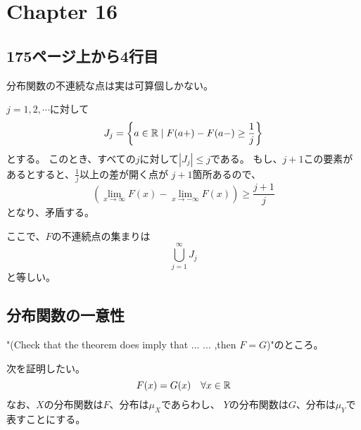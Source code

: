 \section{Chapter 16}
  \subsection{175ページ上から4行目}
    分布関数の不連続な点は実は可算個しかない。

    $j = 1,2,\cdots$に対して
    \[
      J_j = \left\{ a \in {\mathbb{R}} \mid F(a+) - F(a-) \ge \frac{1}{j} \right\}
    \]
    とする。
    このとき、すべての$j$に対して$|J_j| \leq j$である。
    もし、$j+1$この要素があるとすると、$\frac{1}{j}$以上の差が開く点が
    $j+1$箇所あるので、
    \[
      \left(\lim_{x \to \infty}F(x) - \lim_{x \to -\infty}F(x)\right) \ge \frac{j+1}{j}
    \]
    となり、矛盾する。

    ここで、$F$の不連続点の集まりは
    \[
      \bigcup_{j=1}^{\infty}J_j
    \]
    と等しい。

  \subsection{分布関数の一意性}
    "(Check that the theorem does imply that ... ... ,then $F = G$)"のところ。

    次を証明したい。
    \[
      F(x) = G(x) \quad \forall x \in {\mathbb{R}}
    \]
    なお、$X$の分布関数は$F$、分布は$\mu_X$であらわし、
    $Y$の分布関数は$G$、分布は$\mu_Y$で表すことにする。

